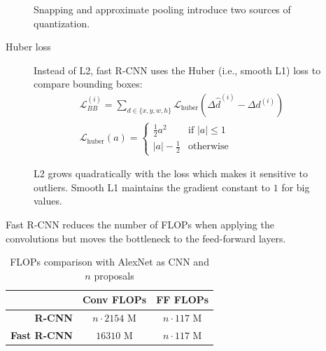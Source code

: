 \begin{description}
\begin{description}
                \begin{remark}
                    Snapping and approximate pooling introduce two sources of quantization.
                \end{remark}

            \item[Huber loss] 
                Instead of L2, fast R-CNN uses the Huber (i.e., smooth L1) loss to compare bounding boxes:
                \[ 
                    \begin{gathered}
                        \mathcal{L}_{BB}^{(i)} = \sum_{d \in \{ x, y, w, h \}} \mathcal{L}_\text{huber}\left( \Delta\hat{d}^{(i)} - \Delta d^{(i)} \right) \\
                        \mathcal{L}_\text{huber}(a) = \begin{cases}
                            \frac{1}{2}a^2 & \text{if $|a| \leq 1$} \\
                            |a| - \frac{1}{2} & \text{otherwise}
                        \end{cases}
                    \end{gathered}
                \]

                \begin{remark}
                    L2 grows quadratically with the loss which makes it sensitive to outliers. Smooth L1 maintains the gradient constant to $1$ for big values.
                \end{remark}
        \end{description}

        \begin{remark}
            Fast R-CNN reduces the number of FLOPs when applying the convolutions but moves the bottleneck to the feed-forward layers.
            \begin{table}[H]
                \centering
                \footnotesize
                \begin{tabular}{rcc}
                    \toprule
                    & \textbf{Conv FLOPs} & \textbf{FF FLOPs} \\
                    \midrule
                    \textbf{R-CNN} & $n \cdot 2154$ M & $n \cdot 117$ M \\
                    \textbf{Fast R-CNN} & $\num{16310}$ M & $n \cdot 117$ M \\
                    \bottomrule
                \end{tabular}
                \caption{FLOPs comparison with AlexNet as CNN and $n$ proposals}
            \end{table}
        \end{remark}


\end{description}
